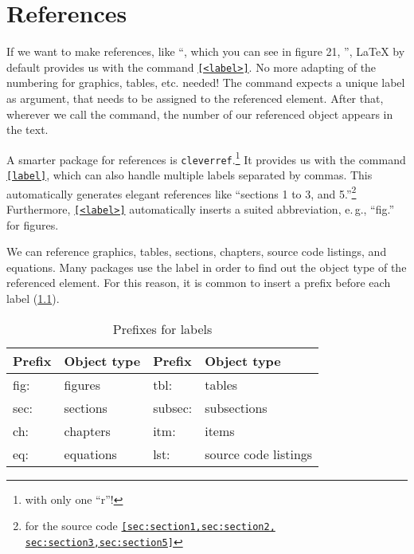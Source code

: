 \chapter{References}
\label{sec:references}

If we want to make references, like \enquote{\textellipsis , which you can see in figure 21, \textellipsis}, \LaTeX{} by default provides us with the command \texttt{\ref{<label>}}. No more adapting of the numbering for graphics, tables, etc. needed!
The command expects a unique label as argument, that needs to be assigned to 
the referenced element. After that, wherever we call the command, the number of 
our referenced object appears in the text.

A smarter package for references is \texttt{cleverref}.\footnote{with only one \enquote{r}!}
It provides us with the command \texttt{\cref{label}}, which can also handle multiple labels separated by commas.
This automatically generates elegant references like \enquote{sections 1 to 3, and 5.}\footnote{for the source code \texttt{\cref{sec:section1,sec:section2,
sec:section3,sec:section5}}}
Furthermore, \texttt{\ref{<label>}} automatically inserts a suited abbreviation, e.\,g., \enquote{fig.} for figures.

We can reference graphics, tables, sections, chapters, source code listings, and equations. 
Many packages use the label in order to find out the object type of the referenced element.
For this reason, it is common to insert a prefix before each label (\cref{lst:reference-prefixes}).

\begin{table}[H]
  \centering
  \begin{tabular}{@{}llll@{}}
    \toprule
    Prefix & Object type & Prefix & Object type \\ \midrule
    fig: & figures & tbl:    & tables            \\ 
    sec: & sections  & subsec: & subsections     \\
    ch:  & chapters     & itm:    & items \\
    eq:  & equations & lst:    & source code listings  \\ \bottomrule
  \end{tabular}
  \caption{Prefixes for labels}
  \label{lst:reference-prefixes}
\end{table}

